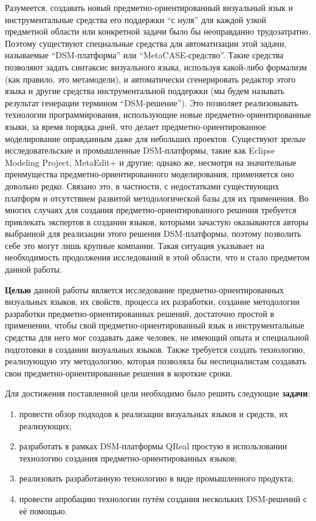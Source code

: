 Разумеется, создавать новый предметно-ориентированный визуальный язык и 
инструментальные средства его поддержки "`с нуля"' для каждой узкой предметной 
области или конкретной задачи было бы неоправданно трудозатратно. Поэтому 
существуют специальные средства для автоматизации этой задачи, называемые 
"`DSM-платформа"' или "`MetaCASE-средство"'. Такие средства позволяют задать 
синтаксис визуального языка, используя какой-либо формализм (как правило, 
это метамодели), и автоматически сгенерировать редактор этого языка и другие средства инструментальной 
поддержки (мы будем называть результат генерации термином "`DSM-решение"'). 
Это позволяет реализовывать технологии программирования, использующие новые предметно-ориентированные языки, за время 
порядка дней, что делает предметно-ориентированное моделирование оправданным 
даже для небольших проектов. Существуют зрелые исследовательские и промышленные 
DSM-платформы, такие как Eclipse Modeling Project, MetaEdit+ и другие; однако же, 
несмотря на значительные преимущества предметно-ориентированного 
моделирования, применяется оно довольно редко. Связано это, в частности, с 
недостатками существующих платформ и отсутствием развитой методологической 
базы для их применения. Во многих случаях для создания предметно-ориентированного 
решения требуется привлекать экспертов в создании языков, которыми зачастую 
оказываются авторы выбранной для реализации этого решения DSM-платформы, поэтому 
позволить себе это могут лишь крупные компании. Такая ситуация указывает на 
необходимость продолжения исследований в этой области, что и стало предметом 
данной работы.

\textbf{Целью} данной работы является исследование предметно-ориентированных 
визуальных языков, их свойств, процесса их разработки, создание методологии 
разработки предметно-ориентированных решений, достаточно простой в применении, 
чтобы свой предметно-ориентированный язык и инструментальные средства для него 
мог создавать даже человек, не имеющий опыта и специальной подготовки в создании 
визуальных языков. Также требуется создать технологию, реализующую эту методологию, 
которая позволяла бы неспециалистам создавать свои предметно-ориентированные решения 
в короткие сроки. 

Для достижения поставленной цели необходимо было решить следующие \textbf{задачи}:
\begin{enumerate}
	\item провести обзор подходов к реализации визуальных языков и средств, их реализующих;
	\item разработать в рамках DSM-платформы QReal простую в использовании технологию создания предметно-ориентированных языков;
	\item реализовать разработанную технологию в виде промышленного продукта;
	\item провести апробацию технологии путём создания нескольких DSM-решений с её помощью.
\end{enumerate}

